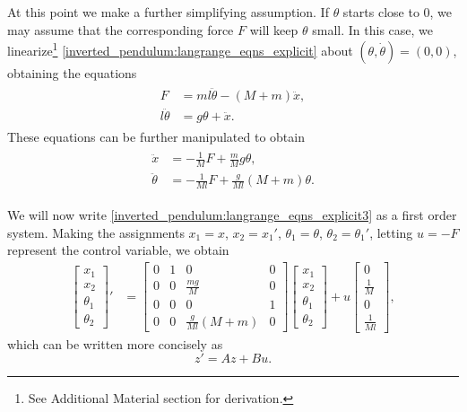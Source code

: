 At this point we make a further simplifying assumption. 
If $\theta$ starts close to $0$, we may assume that the corresponding force $F$ will keep $\theta$ small. 
In this case, we linearize\footnote{See Additional Material section for derivation.} \eqref{inverted_pendulum:langrange_eqns_explicit} about $(\theta, \dot{\theta}) = (0,0)$, obtaining the equations 
\begin{align*}
	\begin{split}
		F &= ml\ddot{\theta} - (M + m)\ddot{x},\\
		l \ddot{\theta} &= g \theta + \ddot{x}.
	\end{split}%
\end{align*}
These equations can be further manipulated 
to obtain 
\begin{align}
	\begin{split}
		\ddot{x} &=  - \frac{1}{M}F + \frac{m}{M}g\theta,\\
		\ddot{\theta} &= -\frac{1}{Ml}F + \frac{g}{Ml} (M+m) \theta.
	\end{split}\label{inverted_pendulum:langrange_eqns_explicit3}
\end{align}

We will now write \eqref{inverted_pendulum:langrange_eqns_explicit3} as a first order system. 
Making the assignments $x_1 = x$, $x_2 = x_1'$, $\theta_1 = \theta$, $\theta_2 = \theta_1'$, letting $u = -F$ represent the control variable, we obtain 
\begin{align*}
\begin{bmatrix}
x_1\\
x_2 \\
\theta_1 \\
\theta_2
\end{bmatrix}' &= 
\begin{bmatrix}
0 & 1 & 0 & 0\\
0 & 0 & \frac{mg}{M} & 0 \\
0 & 0 & 0 & 1 \\
0 & 0 & \frac{g}{Ml}(M+m) & 0
\end{bmatrix}
\begin{bmatrix}
x_1\\
x_2 \\
\theta_1 \\
\theta_2
\end{bmatrix} + u
\begin{bmatrix}
0\\
\frac{1}{M} \\
0 \\
\frac{1}{Ml}
\end{bmatrix},
\end{align*}
which can be written more concisely as 
\[z' = Az + Bu.\]

